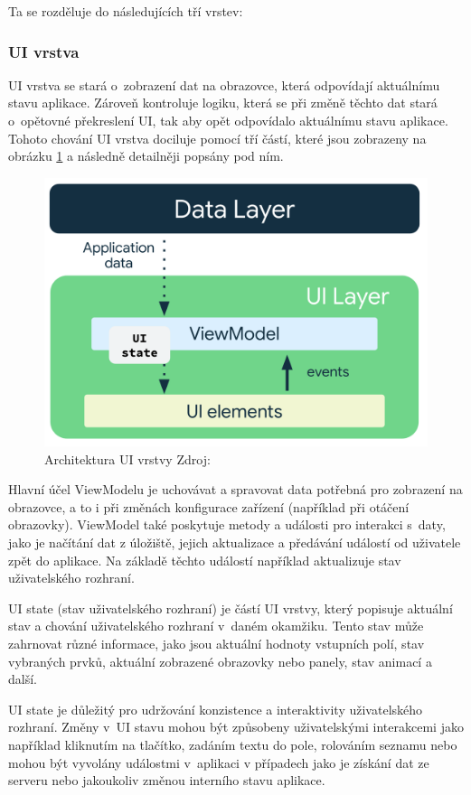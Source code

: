 Ta se rozděluje do následujících tří vrstev:

\subsubsection*{UI vrstva} \label{UILayerNavrh}
UI vrstva se stará o~zobrazení dat na obrazovce, která odpovídají aktuálnímu stavu aplikace. Zároveň kontroluje logiku, která
se při změně těchto dat stará o~opětovné překreslení UI, tak aby opět odpovídalo aktuálnímu stavu aplikace. Tohoto chování UI vrstva 
dociluje pomocí tří částí, které jsou zobrazeny na obrázku \ref{fig:arch_ui_udf} a následně detailněji popsány pod ním.

\begin{figure}[H]
  \centering
  \includegraphics[width=.5\textwidth]{arch-ui-udf.png}
  \caption{Architektura UI vrstvy Zdroj: \cite{imgDataFlow}}
  \label{fig:arch_ui_udf}
\end{figure}

Hlavní účel ViewModelu je uchovávat a spravovat data potřebná pro zobrazení na obrazovce, a to i při změnách konfigurace zařízení 
(například při otáčení obrazovky). ViewModel také poskytuje metody a události pro interakci s~daty, jako je načítání dat z úložiště, 
jejich aktualizace a předávání událostí od uživatele zpět do aplikace. Na základě těchto událostí například aktualizuje stav uživatelského
rozhraní. %

 \label{UIStateParagraph}
UI state (stav uživatelského rozhraní) je částí UI vrstvy, který popisuje aktuální stav a chování uživatelského 
rozhraní v~daném okamžiku. Tento stav může zahrnovat různé informace, jako jsou aktuální hodnoty vstupních polí, stav vybraných prvků,
 aktuální zobrazené obrazovky nebo panely, stav animací a další.

UI state je důležitý pro udržování konzistence a interaktivity uživatelského rozhraní. Změny v~UI stavu mohou být způsobeny uživatelskými
interakcemi jako například kliknutím na tlačítko, zadáním textu do pole, rolováním seznamu nebo mohou být vyvolány událostmi v~aplikaci v případech 
jako je získání dat ze serveru nebo jakoukoliv změnou interního stavu aplikace. 

